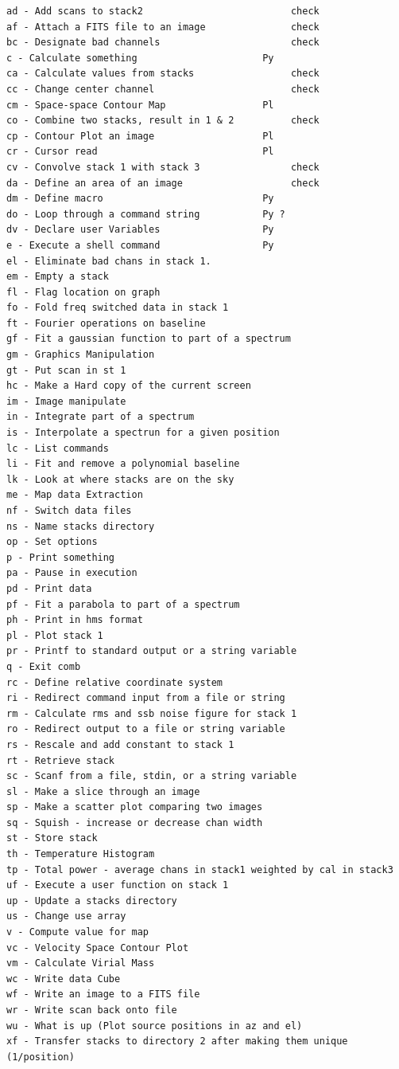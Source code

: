 \documentclass[12pt,a4paper]{article}
\begin{document}
\footnotesize\begin{verbatim}
ad - Add scans to stack2                          check
af - Attach a FITS file to an image               check
bc - Designate bad channels                       check
c - Calculate something                      Py
ca - Calculate values from stacks                 check
cc - Change center channel                        check
cm - Space-space Contour Map                 Pl
co - Combine two stacks, result in 1 & 2          check
cp - Contour Plot an image                   Pl
cr - Cursor read                             Pl
cv - Convolve stack 1 with stack 3                check
da - Define an area of an image                   check
dm - Define macro                            Py
do - Loop through a command string           Py ?
dv - Declare user Variables                  Py 
e - Execute a shell command                  Py
el - Eliminate bad chans in stack 1.
em - Empty a stack
fl - Flag location on graph
fo - Fold freq switched data in stack 1
ft - Fourier operations on baseline
gf - Fit a gaussian function to part of a spectrum
gm - Graphics Manipulation
gt - Put scan in st 1
hc - Make a Hard copy of the current screen
im - Image manipulate
in - Integrate part of a spectrum
is - Interpolate a spectrun for a given position
lc - List commands
li - Fit and remove a polynomial baseline
lk - Look at where stacks are on the sky
me - Map data Extraction
nf - Switch data files
ns - Name stacks directory
op - Set options
p - Print something
pa - Pause in execution
pd - Print data
pf - Fit a parabola to part of a spectrum
ph - Print in hms format
pl - Plot stack 1
pr - Printf to standard output or a string variable
q - Exit comb
rc - Define relative coordinate system
ri - Redirect command input from a file or string
rm - Calculate rms and ssb noise figure for stack 1
ro - Redirect output to a file or string variable
rs - Rescale and add constant to stack 1
rt - Retrieve stack
sc - Scanf from a file, stdin, or a string variable
sl - Make a slice through an image
sp - Make a scatter plot comparing two images
sq - Squish - increase or decrease chan width
st - Store stack
th - Temperature Histogram
tp - Total power - average chans in stack1 weighted by cal in stack3
uf - Execute a user function on stack 1
up - Update a stacks directory
us - Change use array
v - Compute value for map
vc - Velocity Space Contour Plot
vm - Calculate Virial Mass
wc - Write data Cube
wf - Write an image to a FITS file
wr - Write scan back onto file
wu - What is up (Plot source positions in az and el)
xf - Transfer stacks to directory 2 after making them unique (1/position)

\end{verbatim}
\normalsize
\end{document}
